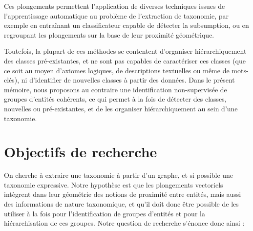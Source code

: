 
Ces plongements permettent l'application de diverses techniques issues de l'apprentissage automatique au problème de l'extraction de taxonomie, par exemple en entraînant un classificateur capable de détecter la subsumption, ou en regroupant les plongements sur la base de leur proximité géométrique.


Toutefois, la plupart de ces méthodes se contentent d'organiser hiérarchiquement des classes pré-existantes, et ne sont pas capables de caractériser ces classes (que ce soit au moyen d'axiomes logiques, de descriptions textuelles ou même de mots-clés), ni d'identifier de nouvelles classes à partir des données.
%
Dans le présent mémoire, nous proposons au contraire une identification non-supervisée de groupes d'entités cohérents, ce qui permet à la fois de détecter des classes, nouvelles ou pré-existantes, et de les organiser hiérarchiquement au sein d'une taxonomie. %




\section{Objectifs de recherche}  %

On cherche à extraire une taxonomie à partir d'un graphe, et si possible une taxonomie expressive. 
%
Notre hypothèse est que les plongements vectoriels intègrent dans leur géométrie des notions de proximité entre entités, mais aussi des informations de nature taxonomique, et
%
qu'il doit donc être possible de les utiliser à la fois pour l'identification de groupes d'entités et pour la hiérarchisation de ces groupes. 
%
Notre question de recherche s'énonce donc ainsi :

